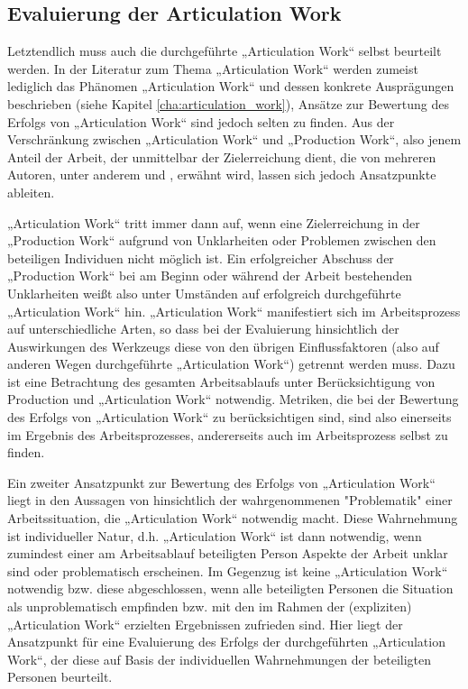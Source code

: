 \subsection{Evaluierung der Articulation Work}
\label{sub:eval_articulation_work}

Letztendlich muss auch die durchgeführte „Articulation Work“ selbst beurteilt werden. In der Literatur zum Thema „Articulation Work“ werden zumeist lediglich das Phänomen „Articulation Work“ und dessen konkrete Ausprägungen beschrieben (siehe Kapitel \ref{cha:articulation_work}), Ansätze zur Bewertung des Erfolgs von „Articulation Work“ sind jedoch selten zu finden. Aus der Verschränkung zwischen „Articulation Work“ und „Production Work“, also jenem Anteil der Arbeit, der unmittelbar der Zielerreichung dient, die von mehreren Autoren, unter anderem \citet{Fujimura87} und \citet{Strauss93}, erwähnt wird, lassen sich jedoch Ansatzpunkte ableiten.

„Articulation Work“ tritt immer dann auf, wenn eine Zielerreichung in der „Production Work“ aufgrund von Unklarheiten oder Problemen zwischen den beteiligen Individuen nicht möglich ist. Ein erfolgreicher Abschuss der „Production Work“ bei am Beginn oder während der Arbeit bestehenden Unklarheiten weißt also unter Umständen auf erfolgreich durchgeführte „Articulation Work“ hin. „Articulation Work“ manifestiert sich im Arbeitsprozess auf unterschiedliche Arten, so dass bei der Evaluierung hinsichtlich der Auswirkungen des Werkzeugs diese von den übrigen Einflussfaktoren (also auf anderen Wegen durchgeführte „Articulation Work“) getrennt werden muss. Dazu ist eine Betrachtung des gesamten Arbeitsablaufs unter Berücksichtigung von Production und „Articulation Work“ notwendig. Metriken, die bei der Bewertung des Erfolgs von „Articulation Work“ zu berücksichtigen sind, sind also einerseits im Ergebnis des Arbeitsprozesses, andererseits auch im Arbeitsprozess selbst zu finden.

Ein zweiter Ansatzpunkt zur Bewertung des Erfolgs von „Articulation Work“ liegt in den Aussagen von \citet{Strauss93} hinsichtlich der wahrgenommenen "Problematik" einer Arbeitssituation, die „Articulation Work“ notwendig macht. Diese Wahrnehmung ist individueller Natur, d.h. „Articulation Work“ ist dann notwendig, wenn zumindest einer am Arbeitsablauf beteiligten Person Aspekte der Arbeit unklar sind oder problematisch erscheinen. Im Gegenzug ist keine „Articulation Work“ notwendig bzw. diese abgeschlossen, wenn alle beteiligten Personen die Situation als unproblematisch empfinden bzw. mit den im Rahmen der (expliziten) „Articulation Work“ erzielten Ergebnissen zufrieden sind. Hier liegt der Ansatzpunkt für eine Evaluierung des Erfolgs der durchgeführten „Articulation Work“, der diese auf Basis der individuellen Wahrnehmungen der beteiligten Personen beurteilt.


